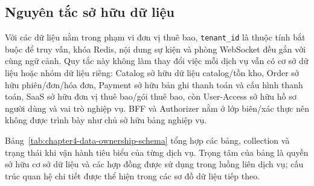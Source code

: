 \subsection{Nguyên tắc sở hữu dữ liệu}

Với các dữ liệu nằm trong phạm vi đơn vị thuê bao, \texttt{tenant\_id} là thuộc tính bắt buộc để truy vấn, khóa Redis, nội dung sự kiện và phòng WebSocket đều gắn với cùng ngữ cảnh. Quy tắc này không làm thay đổi việc mỗi dịch vụ vẫn có cơ sở dữ liệu hoặc nhóm dữ liệu riêng: Catalog sở hữu dữ liệu catalog/tồn kho, Order sở hữu phiên/đơn/hóa đơn, Payment sở hữu bản ghi thanh toán và cấu hình thanh toán, SaaS sở hữu đơn vị thuê bao/gói thuê bao, còn User-Access sở hữu hồ sơ người dùng và vai trò nghiệp vụ. BFF và Authorizer nằm ở lớp biên/xác thực nên không được trình bày như chủ sở hữu bảng nghiệp vụ.

Bảng~\ref{tab:chapter4-data-ownership-schema} tổng hợp các bảng, collection và trạng thái khi vận hành tiêu biểu của từng dịch vụ. Trọng tâm của bảng là quyền sở hữu cơ sở dữ liệu và các hợp đồng được sử dụng trong luồng liên dịch vụ; cấu trúc quan hệ chi tiết được thể hiện trong các sơ đồ dữ liệu tiếp theo.

